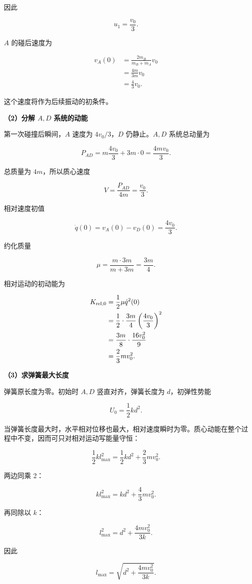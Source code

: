 \documentclass[12pt,a4paper,UTF8]{ctexart}
\begin{document}
因此

\[
\boxed{u_1=\frac{v_0}{3}}.
\]

\(A\) 的碰后速度为

\[
\begin{aligned}
v_A(0)
&=\frac{2m_B}{m_B+m_A}v_0\\
&=\frac{4m}{3m}v_0\\
&=\frac43v_0.
\end{aligned}
\]

这个速度将作为后续振动的初条件。

\textbf{（2）分解 \(A,D\) 系统的动能}

第一次碰撞后瞬间，\(A\) 速度为 \(4v_0/3\)，\(D\) 仍静止。\(A,D\)
系统总动量为

\[
P_{AD}=m\frac{4v_0}{3}+3m\cdot0=\frac{4mv_0}{3}.
\]

总质量为 \(4m\)，所以质心速度

\[
\boxed{V=\frac{P_{AD}}{4m}=\frac{v_0}{3}}.
\]

相对速度初值

\[
\dot q(0)=v_A(0)-v_D(0)=\frac{4v_0}{3}.
\]

约化质量

\[
\mu=\frac{m\cdot3m}{m+3m}=\frac{3m}{4}.
\]

相对运动的初动能为

\[
\begin{aligned}
K_{\rm rel,0}
&=\frac12\mu\dot q^2(0)\\
&=\frac12\cdot\frac{3m}{4}
\left(\frac{4v_0}{3}\right)^2\\
&=\frac{3m}{8}\cdot\frac{16v_0^2}{9}\\
&=\frac23mv_0^2.
\end{aligned}
\]

\textbf{（3）求弹簧最大长度}

弹簧原长度为零。初始时 \(A,D\) 竖直对齐，弹簧长度为 \(d\)，初弹性势能

\[
U_0=\frac12kd^2.
\]

当弹簧长度最大时，水平相对位移也最大，相对速度瞬时为零。质心动能在整个过程中不变，因而可只对相对运动写能量守恒：

\[
\frac12kl_{\max}^2
=\frac12kd^2+\frac23mv_0^2.
\]

两边同乘 2：

\[
kl_{\max}^2=kd^2+\frac43mv_0^2.
\]

再同除以 \(k\)：

\[
l_{\max}^2=d^2+\frac{4mv_0^2}{3k}.
\]

因此

\[
\boxed{l_{\max}=\sqrt{d^2+\frac{4mv_0^2}{3k}}}.
\]
\end{document}
